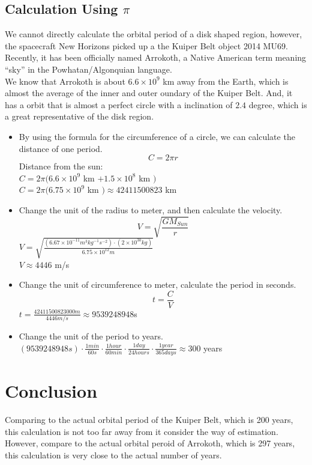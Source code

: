 \documentclass{article}
\begin{document}
\subsection{Calculation Using $\pi$}
We cannot directly calculate the orbital period of a disk shaped region, however, the spacecraft New Horizons picked up a the Kuiper Belt object 2014 MU69. Recently, it has been officially named Arrokoth, a Native American term meaning “sky” in the Powhatan/Algonquian language\citep{sky}. \\
We know that Arrokoth is about $6.6\times 10^{9}$ km away from the Earth, which is almost the average of the inner and outer oundary of the Kuiper Belt. And, it has a orbit that is almost a perfect circle with a inclination of $2.4$ degree, which is a great representative of the disk region.
\begin{itemize}
    \item By using the formula for the circumference of a circle, we can calculate the distance of one period.\\
    \begin{equation}
        C = 2\pi r
    \end{equation}
    Distance from the sun:\\
    $C = 2\pi (6.6\times 10^{9}$ km $+ 1.5\times 10^{8}$ km $)$ \\
    $C = 2\pi (6.75\times 10^{9}$ km $) \approx 42411500823$ km
    \item Change the unit of the radius to meter, and then calculate the velocity.\\
    \begin{equation}
        V = \sqrt{\frac{GM_{Sun}}{r}}
    \end{equation}
    $V = \sqrt{\frac{(6.67\times 10^{-11}m^{3}kg^{-1}s^{-2})\cdot (2\times 10^{30}kg)}{6.75\times 10^{12}m}}$\\
    $V \approx 4446$ m/s
    \item Change the unit of circumference to meter, calculate the period in seconds.\\
    \begin{equation}
        t = \frac{C}{V}
    \end{equation}
    $t = \frac{42411500823000m}{4446 m/s} \approx 9539248948$s
    \item Change the unit of the period to years.\\
    $(9539248948s) \cdot \frac{1 min}{60s} \cdot \frac{1 hour}{60 min} \cdot \frac{1 day}{24 hours}\cdot \frac{1 year}{365 days} \approx 300 $ years
\end{itemize}

\section{Conclusion}
Comparing to the actual orbital period of the Kuiper Belt, which is 200 years, this calculation is not too far away from it consider the way of estimation. However, compare to the actual orbital peroid of Arrokoth, which is 297 years, this calculation is very close to the actual number of years. 



\end{document}
